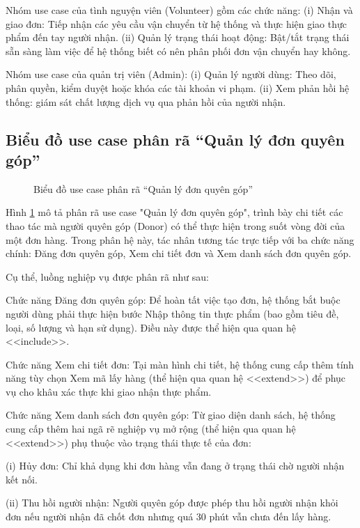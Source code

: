 \documentclass[../main.tex]{subfiles}%
\begin{document}
Nhóm use case của tình nguyện viên (Volunteer) gồm các chức năng: (i) Nhận và giao đơn: Tiếp nhận các yêu cầu vận chuyển từ hệ thống và thực hiện giao thực phẩm đến tay người nhận. (ii) Quản lý trạng thái hoạt động: Bật/tắt trạng thái sẵn sàng làm việc để hệ thống biết có nên phân phối đơn vận chuyển hay không.

Nhóm use case của quản trị viên (Admin): (i) Quản lý người dùng: Theo dõi, phân quyền, kiểm duyệt hoặc khóa các tài khoản vi phạm. (ii) Xem phản hồi hệ thống: giám sát chất lượng dịch vụ qua phản hồi của người nhận.


\subsection{Biểu đồ use case phân rã ``Quản lý đơn quyên góp''}
\label{section:2.3.2}

\begin{figure}[H]
    \centering
    \caption{Biểu đồ use case phân rã ``Quản lý đơn quyên góp''}
    \label{fig:usecase_don_quyen_gop}
\end{figure}

Hình \ref{fig:usecase_don_quyen_gop} mô tả phân rã use case "Quản lý đơn quyên góp", trình bày chi tiết các thao tác mà người quyên góp (Donor) có thể thực hiện trong suốt vòng đời của một đơn hàng. Trong phân hệ này, tác nhân tương tác trực tiếp với ba chức năng chính: Đăng đơn quyên góp, Xem chi tiết đơn và Xem danh sách đơn quyên góp.

Cụ thể, luồng nghiệp vụ được phân rã như sau:

Chức năng Đăng đơn quyên góp: Để hoàn tất việc tạo đơn, hệ thống bắt buộc người dùng phải thực hiện bước Nhập thông tin thực phẩm (bao gồm tiêu đề, loại, số lượng và hạn sử dụng). Điều này được thể hiện qua quan hệ <<include>>.

Chức năng Xem chi tiết đơn: Tại màn hình chi tiết, hệ thống cung cấp thêm tính năng tùy chọn Xem mã lấy hàng (thể hiện qua quan hệ <<extend>>) để phục vụ cho khâu xác thực khi giao nhận thực phẩm.

Chức năng Xem danh sách đơn quyên góp: Từ giao diện danh sách, hệ thống cung cấp thêm hai ngã rẽ nghiệp vụ mở rộng (thể hiện qua quan hệ <<extend>>) phụ thuộc vào trạng thái thực tế của đơn:

(i) Hủy đơn: Chỉ khả dụng khi đơn hàng vẫn đang ở trạng thái chờ người nhận kết nối.

(ii) Thu hồi người nhận: Người quyên góp được phép thu hồi người nhận khỏi đơn nếu người nhận đã chốt đơn nhưng quá 30 phút vẫn chưa đến lấy hàng.
\end{document}
